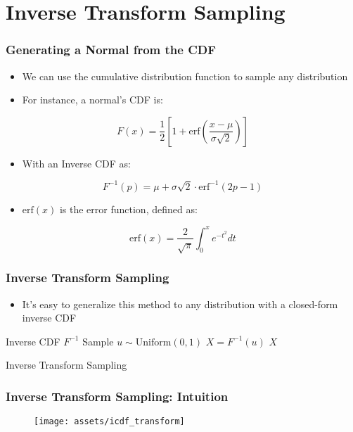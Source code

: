 \documentclass{beamer}
\begin{document}
\section{Inverse Transform Sampling}
\begin{frame}
\frametitle{Generating a Normal from the CDF}
\begin{itemize}
  \item We can use the cumulative distribution function to sample any distribution
  \item For instance, a normal's CDF is:
\end{itemize}
\begin{equation*}
  F(x) = \frac{1}{2} \left[ 1 + \text{erf}\left( \frac{x - \mu}{\sigma \sqrt{2}} \right) \right]
\end{equation*}
\begin{itemize}
  \item With an Inverse CDF as:
\end{itemize}
\begin{equation*}
  F^{-1}(p) = \mu + \sigma \sqrt{2} \cdot \text{erf}^{-1}\left( 2p - 1 \right)
\end{equation*}
\begin{itemize}
  \item $\text{erf}(x)$ is the error function, defined as:
\end{itemize}
\begin{equation*}
  \text{erf}(x) = \frac{2}{\sqrt{\pi}} \int^{x}_{0} e^{-t^2} dt
\end{equation*}
\end{frame}


\begin{frame}
\frametitle{Inverse Transform Sampling}
\begin{itemize}
  \item It's easy to generalize this method to any distribution with a closed-form inverse CDF
\end{itemize}
\begin{algorithm}[H]
\begin{algorithmic}[1]
  \REQUIRE Inverse CDF $F^{-1}$
  \STATE Sample $u \sim \text{Uniform}(0, 1)$
  \STATE $X = F^{-1} (u)$
  \ENSURE $X$
\end{algorithmic}
\caption{Inverse Transform Sampling}
\end{algorithm}
\end{frame}

\begin{frame}
  \frametitle{Inverse Transform Sampling: Intuition}
  \begin{figure}
    \centering
    \texttt{[image: assets/icdf\_transform]}
  \end{figure}
\end{frame}
\end{document}
